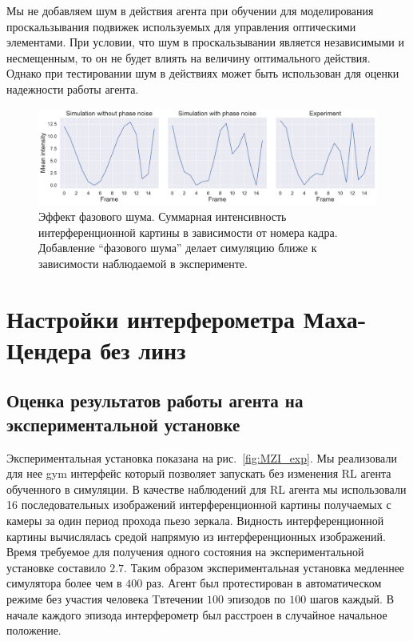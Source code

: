 Мы не добавляем шум в действия агента при обучении для моделирования проскальзывания подвижек используемых для управления оптическими элементами. При условии, что шум в проскальзывании является независимыми и несмещенным, то он не будет влиять на величину оптимального действия. 
Однако при тестировании шум в действиях может быть использован для оценки надежности работы агента.


\begin{figure}
  \includegraphics[width=1\linewidth]{images/Piezo_noise.pdf}
  \centering
  \caption{Эффект фазового шума. Суммарная интенсивность интерференционной картины в зависимости от номера кадра. Добавление ``фазового шума'' делает симуляцию ближе к зависимости наблюдаемой в эксперименте.}
  \label{fig:piezo_noise}
\end{figure}


\section{Настройки интерферометра Маха-Цендера без линз}

\subsection{Оценка результатов работы агента на экспериментальной установке}
Экспериментальная установка показана на рис.~\ref{fig:MZI_exp}. Мы реализовали для нее gym интерфейс \cite{brockman2016openai} который позволяет запускать без изменения RL агента обученного в симуляции. В качестве наблюдений для RL агента мы использовали 16 последовательных изображений интерференционной картины получаемых с камеры за один период прохода пьезо зеркала. Видность интерференционной картины вычислялась средой напрямую из интерференционных изображений. Время требуемое для получения одного состояния на экспериментальной установке составило $2.7$. Таким образом экспериментальная установка медленнее симулятора более чем в $400$ раз. Агент был протестирован в автоматическом режиме без участия человека Tвтечении $100$ эпизодов по $100$ шагов каждый. В начале каждого эпизода интерферометр был расстроен в случайное начальное положение. 

